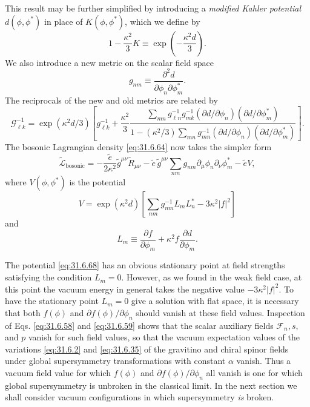 This result may be further simplified by introducing a \emph{modified
Kahler potential} \(d(\phi,\phi^*)\) in place of \(K(\phi,\phi^*)\),
which we define by
\begin{equation}
  1-\frac{\kappa^2}{3}K
  \equiv\exp\left(-\frac{\kappa^2d}{3}\right).
  \tag{31.6.65}\label{eq:31.6.65}
\end{equation}
We also introduce a new metric on the scalar field space
\begin{equation}
  g_{nm}\equiv
  \frac{\partial^2d}{\partial\phi_n\partial\phi_m^*}.
  \tag{31.6.66}\label{eq:31.6.66}
\end{equation}
The reciprocals of the new and old metrics are related by
\[
  \mathcal G^{-1}_{\ell k}
  =\exp(\kappa^2d/3)\left[
    g^{-1}_{\ell k}
    +\frac{\kappa^2}{3}
     \frac{
       \displaystyle\sum_{mn}
       g^{-1}_{\ell n}g^{-1}_{mk}
       (\partial d/\partial\phi_n)
       (\partial d/\partial\phi_m^*)
     }{
       \displaystyle
       1-(\kappa^2/3)\sum_{mn}
       g^{-1}_{mn}
       (\partial d/\partial\phi_n)
       (\partial d/\partial\phi_m^*)
     }
  \right].
\]
The bosonic Lagrangian density \eqref{eq:31.6.64} now takes the simpler
form
\begin{equation}
  \widetilde{\mathcal L}_{\mathrm{bosonic}}
  =-\frac{\widetilde e}{2\kappa^2}
    \widetilde g^{\mu\nu}\widetilde R_{\mu\nu}
   -\widetilde e\,\widetilde g^{\mu\nu}
    \sum_{nm}g_{nm}\partial_\mu\phi_n\partial_\nu\phi_m^*
   -\widetilde eV,
  \tag{31.6.67}\label{eq:31.6.67}
\end{equation}
where \(V(\phi,\phi^*)\) is the potential
\begin{equation}
  V
  =\exp(\kappa^2d)\left[
    \sum_{nm}g^{-1}_{nm}L_mL_n^*
    -3\kappa^2|f|^2
  \right]
  \tag{31.6.68}\label{eq:31.6.68}
\end{equation}
and
\begin{equation}
  L_m\equiv
  \frac{\partial f}{\partial\phi_m}
  +\kappa^2f\frac{\partial d}{\partial\phi_m}.
  \tag{31.6.69}\label{eq:31.6.69}
\end{equation}

The potential \eqref{eq:31.6.68} has an obvious stationary point at
field strengths satisfying the condition \(L_m=0\). However, as we
found in the weak field case, at this point the vacuum energy in general
takes the negative value \(-3\kappa^2|f|^2\). To have the stationary
point \(L_m=0\) give a solution with flat space, it is necessary that
both \(f(\phi)\) and \(\partial f(\phi)/\partial\phi_n\) should vanish at
these field values. Inspection of Eqs. \eqref{eq:31.6.58} and
\eqref{eq:31.6.59} shows that the scalar auxiliary fields
\(\mathcal F_n,s,\) and \(p\) vanish for such field values, so that the
vacuum expectation values of the variations \eqref{eq:31.6.2} and
\eqref{eq:31.6.35} of the gravitino and chiral spinor fields under
global supersymmetry transformations with constant \(\alpha\) vanish.
Thus a vacuum field value for which \(f(\phi)\) and
\(\partial f(\phi)/\partial\phi_n\) all vanish is one for which global
supersymmetry is unbroken in the classical limit. In the next section
we shall consider vacuum configurations in which supersymmetry
\emph{is} broken.

